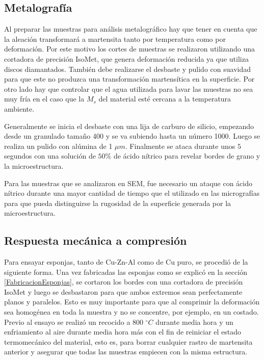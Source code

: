 \documentclass[a4paper,12pt,fleqn,twoside,openany]{book}
\begin{document}
\subsection{Metalografía}

Al preparar las muestras para análisis metalográfico hay que tener en cuenta que la aleación transformará a martensita tanto por temperatura como por deformación. Por este motivo los cortes de muestras se realizaron utilizando una cortadora de precisión IsoMet, que genera deformación reducida ya que utiliza discos diamantados. También debe realizarse el desbaste y pulido con suavidad para que este no produzca una transformación 
martensítica en la superficie. Por otro lado hay que controlar que el agua utilizada para lavar las muestras no sea muy fría en el caso 
que la $M_s$ del material esté cercana a la temperatura ambiente. 

Generalmente se inicia el desbaste con una lija de carburo de silicio, empezando desde un granulado tamaño 400 y se va subiendo hasta un número 1000. 
Luego se realiza un pulido con alúmina de 1 $\mu m$. Finalmente se ataca durante unos $5$ segundos con una solución de $50 \% $ de ácido nítrico para revelar bordes de grano y la microestructura. 

Para las muestras que se analizaron en SEM, fue necesario un ataque con ácido nítrico durante una mayor cantidad de tiempo que el utilizado en las micrografías para que pueda distinguirse la rugosidad de la superficie generada por la microestructura.

\subsection{Respuesta mecánica a compresión} \label{compresión}



Para ensayar esponjas, tanto de Cu-Zn-Al como de Cu puro, se procedió de la siguiente forma. Una vez fabricadas las esponjas como se explicó en la sección  \ref{FabricacionEsponjas}, se cortaron los bordes con una cortadora de precisión IsoMet y luego se desbastaron para que ambos extremos sean perfectamente planos y paralelos. Esto es muy importante para que al comprimir la deformación sea homogénea en toda la muestra y no se concentre, por ejemplo, en un costado. Previo al ensayo se realizó un recocido a 800 $^\circ C$ durante media hora y un enfriamiento al aire durante media hora más con el fin de reiniciar el estado termomecánico del material, esto es, para borrar cualquier rastro de martensita anterior y asegurar que todas las muestras empiecen con la misma estructura. 
\end{document}
